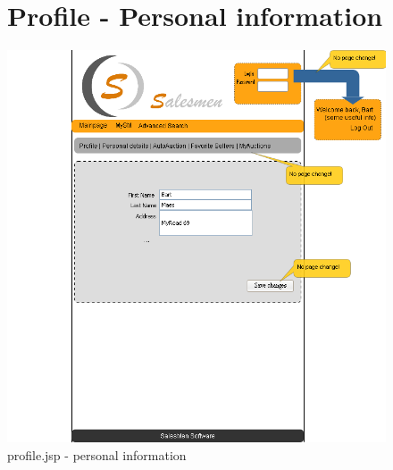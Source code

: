 \documentclass[salesmen, twoside]{../../../templates/latex/2009/softproj}
\begin{document}
\begin{projdoc}
\begin{figure}
\section{Profile - Personal information}
\label{fig_prototype_personal_info}
\includegraphics[width=15cm]{../../img/SM_mySM_personal.png}
\caption{profile.jsp - personal information}
\end{figure}
\begin{figure}

\end{figure}
\end{projdoc}
\end{document}
